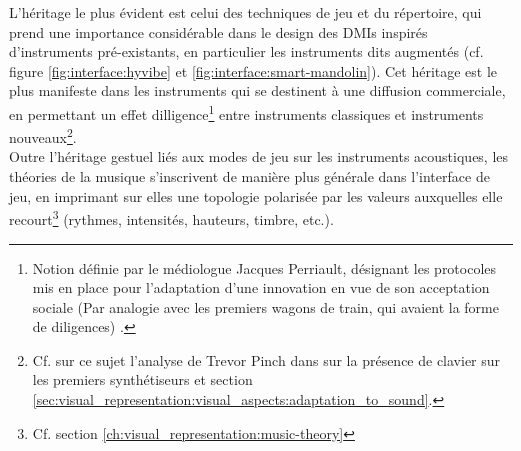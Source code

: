  \noindent L'héritage le plus évident est celui des techniques de jeu et du répertoire, qui prend une importance considérable dans le design des \glspl{DMI} inspirés d'instruments pré-existants, en particulier les instruments dits augmentés (cf. figure \ref{fig:interface:hyvibe} et \ref{fig:interface:smart-mandolin}). Cet héritage est le plus manifeste dans les instruments qui se destinent à une diffusion commerciale, en permettant un effet dilligence\footnote{Notion définie par le médiologue Jacques Perriault, désignant les protocoles mis en place pour l'adaptation d'une innovation en vue de son acceptation sociale (Par analogie avec les premiers wagons de train, qui avaient la forme de diligences) \cite{perriault_lacces_2002}.} entre instruments classiques et instruments nouveaux\footnote{\label{fn:Pinch}Cf. sur ce sujet l'analyse de Trevor Pinch dans \cite{pinch_why_2001} sur la présence de clavier sur les premiers synthétiseurs et section \ref{sec:visual_representation:visual_aspects:adaptation_to_sound}.}.\\
 \indent Outre l'héritage gestuel liés aux modes de jeu sur les instruments acoustiques, les théories de la musique s'inscrivent de manière plus générale dans l'interface de jeu, en imprimant sur elles une topologie polarisée par les valeurs auxquelles elle recourt\footnote{Cf. section \ref{ch:visual_representation:music-theory}} (rythmes, intensités, hauteurs, timbre, etc.).


